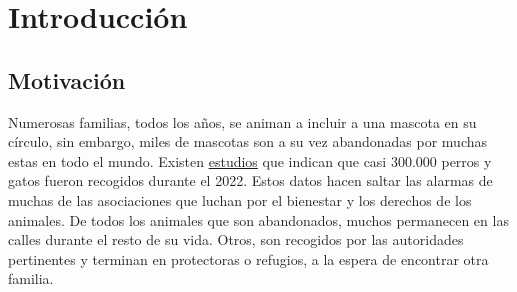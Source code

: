 \documentclass[a4paper, 12pt]{article}
\begin{document}
\newpage
\section{Introducción}

\subsection{Motivación}
Numerosas familias, todos los años, se animan a incluir a una mascota en su círculo, sin embargo, miles de mascotas son a su vez abandonadas por muchas estas en todo el mundo. Existen \href{https://www.fundacion-affinity.org/perros-gatos-y-personas/busco-un-animal-de-compania/las-cifras-del-abandono-de-perros-y-gatos-aun}{estudios} que indican que casi 300.000 perros y gatos fueron recogidos durante el 2022. Estos datos hacen saltar las alarmas de muchas de las asociaciones que luchan por el bienestar y los derechos de los animales. De todos los animales que son abandonados, muchos permanecen en las calles durante el resto de su vida. Otros, son recogidos por las autoridades pertinentes y terminan en protectoras o refugios, a la espera de encontrar otra familia. 
\end{document}
